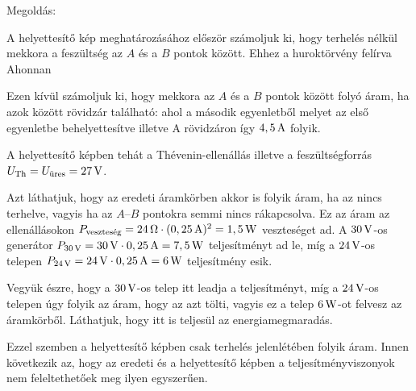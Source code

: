 
\ifdefined\megoldas

 Megoldás: 

 A helyettesítő kép meghatározásához először számoljuk ki, hogy terhelés nélkül mekkora a feszültség az $A$ és a $B$ pontok között. Ehhez a huroktörvény felírva
 Ahonnan

 Ezen kívül számoljuk ki, hogy mekkora az $A$ és a $B$ pontok között folyó áram, ha azok között rövidzár található:
 ahol a második egyenletből
 melyet az első egyenletbe behelyettesítve
 illetve
 A rövidzáron így $4,5\mathrm{\, A}$ folyik. 

 A helyettesítő képben tehát a Th\'evenin-ellenállás
 illetve a feszültségforrás $U_\text{Th}=U_\text{üres}=27\mathrm{\, V}$.

 Azt láthatjuk, hogy az eredeti áramkörben akkor is folyik áram, ha az nincs terhelve, vagyis ha az $A$--$B$ pontokra semmi nincs rákapcsolva. Ez az áram az ellenállásokon $P_\text{veszteség}=24\mathrm{\, \Omega}\cdot (0,25\mathrm{\, A})^2=1,5\mathrm{\, W}$ veszteséget ad. A $30\mathrm{\, V}$-os generátor $P_{30\mathrm{\, V}}=30\mathrm{\, V}\cdot 0,25\mathrm{\, A}=7,5\mathrm{\, W}$ teljesítményt ad le, míg a $24\mathrm{\, V}$-os telepen $P_{24\mathrm{\, V}}=24\mathrm{\, V}\cdot 0,25\mathrm{\, A}=6\mathrm{\, W}$ teljesítmény esik. 

 Vegyük észre, hogy a $30\mathrm{\, V}$-os telep itt leadja a teljesítményt, míg a $24\mathrm{\, V}$-os telepen úgy folyik az áram, hogy az azt tölti, vagyis ez a telep $6\mathrm{\, W}$-ot felvesz az áramkörből. Láthatjuk, hogy itt is teljesül az energiamegmaradás. 

 Ezzel szemben a helyettesítő képben csak terhelés jelenlétében folyik áram. Innen következik az, hogy az eredeti és a helyettesítő képben a teljesítményviszonyok nem feleltethetőek meg ilyen egyszerűen.
 
\fi